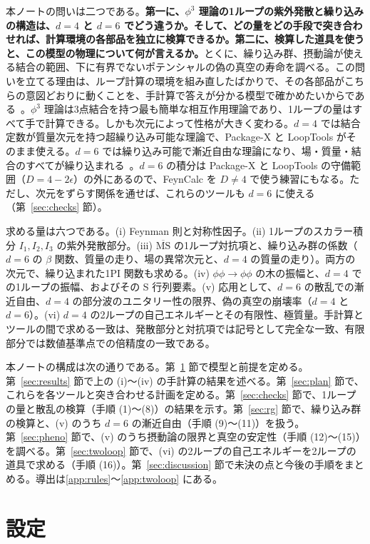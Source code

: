\documentclass[a4paper,10pt]{ltjsarticle}
\begin{document}
本ノートの問いは二つである。\textbf{第一に、$\phi^3$ 理論の1ループの紫外発散と繰り込みの構造は、$d=4$ と $d=6$ でどう違うか。そして、どの量をどの手段で突き合わせれば、計算環境の各部品を独立に検算できるか。第二に、検算した道具を使うと、この模型の物理について何が言えるか。}とくに、繰り込み群、摂動論が使える結合の範囲、下に有界でないポテンシャルの偽の真空の寿命を調べる。この問いを立てる理由は、ループ計算の環境を組み直したばかりで、その各部品がこちらの意図どおりに動くことを、手計算で答えが分かる模型で確かめたいからである~\cite{env}。$\phi^3$ 理論は3点結合を持つ最も簡単な相互作用理論であり、1ループの量はすべて手で計算できる。しかも次元によって性格が大きく変わる。$d=4$ では結合定数が質量次元を持つ超繰り込み可能な理論で、Package-X と LoopTools がそのまま使える。$d=6$ では繰り込み可能で漸近自由な理論になり、場・質量・結合のすべてが繰り込まれる~\cite{srednicki}。$d=6$ の積分は Package-X と LoopTools の守備範囲（$D=4-2\epsilon$）の外にあるので、FeynCalc を $D\neq4$ で使う練習にもなる。ただし、次元をずらす関係を通せば、これらのツールも $d=6$ に使える（第~\ref{sec:checks} 節）。

求める量は六つである。(i) Feynman 則と対称性因子。(ii) 1ループのスカラー積分 $I_1,I_2,I_3$ の紫外発散部分。(iii) $\overline{\mathrm{MS}}$ の1ループ対抗項と、繰り込み群の係数（$d=6$ の $\beta$ 関数、質量の走り、場の異常次元と、$d=4$ の質量の走り）。両方の次元で、繰り込まれた1PI 関数も求める。(iv) $\phi\phi\to\phi\phi$ の木の振幅と、$d=4$ での1ループの振幅、およびその S 行列要素。(v) 応用として、$d=6$ の散乱での漸近自由、$d=4$ の部分波のユニタリー性の限界、偽の真空の崩壊率（$d=4$ と $d=6$）。(vi) $d=4$ の2ループの自己エネルギーとその有限性、極質量。手計算とツールの間で求める一致は、発散部分と対抗項では記号として完全な一致、有限部分では数値基準点での倍精度の一致である。

本ノートの構成は次の通りである。第~\ref{sec:setup} 節で模型と前提を定める。第~\ref{sec:results} 節で上の (i)〜(iv) の手計算の結果を述べる。第~\ref{sec:plan} 節で、これらを各ツールと突き合わせる計画を定める。第~\ref{sec:checks} 節で、1ループの量と散乱の検算（手順 (1)〜(8)）の結果を示す。第~\ref{sec:rg} 節で、繰り込み群の検算と、(v) のうち $d=6$ の漸近自由（手順 (9)〜(11)）を扱う。第~\ref{sec:pheno} 節で、(v) のうち摂動論の限界と真空の安定性（手順 (12)〜(15)）を調べる。第~\ref{sec:twoloop} 節で、(vi) の2ループの自己エネルギーを2ループの道具で求める（手順 (16)）。第~\ref{sec:discussion} 節で未決の点と今後の手順をまとめる。導出は\ref{app:rules}〜\ref{app:twoloop} にある。

\section{設定}\label{sec:setup}
\end{document}
